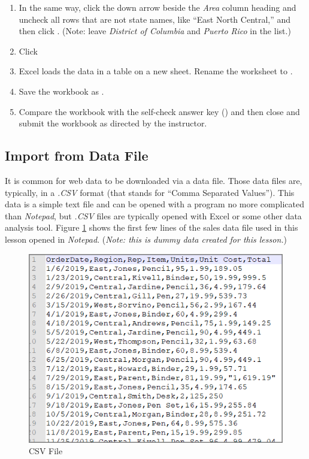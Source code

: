 \begin{enumbox}
\begin{enumerate}
		\item In the same way, click the down arrow beside the \textit{Area} column heading and uncheck all rows that are not state names, like ``East North Central,'' and then click . (Note: leave \textit{District of Columbia} and \textit{Puerto Rico} in the list.)
		\item Click 
		\item Excel loads the data in a table on a new sheet. Rename the worksheet to .
		\item Save the workbook as .
		\item Compare the workbook with the self-check answer key () and then close and submit the  workbook as directed by the instructor.
	\end{enumerate}
\end{enumbox}

\subsection{Import from Data File}\label{07:ImportFromDataFile}

It is common for web data to be downloaded via a data file. Those data files are, typically, in a \textit{.CSV} format (that stands for ``Comma Separated Values''). This data is a simple text file and can be opened with a program no more complicated than \textit{Notepad}, but \textit{.CSV} files are typically opened with Excel or some other data analysis tool. Figure \ref{07:fig04} shows the first few lines of the sales data file used in this lesson opened in \textit{Notepad}. (\textit{Note: this is dummy data created for this lesson.})

\begin{figure}[H]
	\centering
	\includegraphics[width=\maxwidth{.95\linewidth}]{gfx/ch07_fig04}
	\caption{CSV File}
	\label{07:fig04}
\end{figure}

